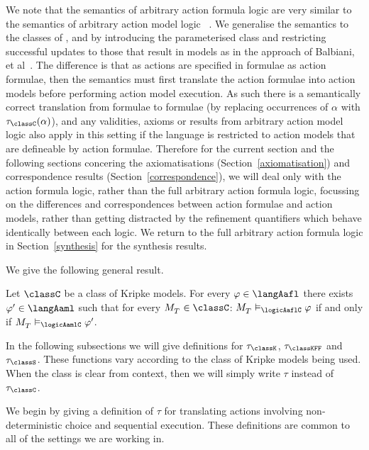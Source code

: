 We note that the semantics of arbitrary action formula logic \logicAaflC{} are very similar to the semantics of arbitrary action model logic \logicAamlC{}~\cite{hales:2013}.
We generalise the semantics to the classes of \classK{}, \classKFF{} and \classS{} by introducing the parameterised class \classC{} and restricting successful updates to those that result in \classC{} models as in the approach of Balbiani, et al~\cite{balbiani:2012}.
The difference is that as actions are specified in \langAafl{} formulae as action formulae, then the semantics must first translate the action formulae into action models before performing action model execution.
As such there is a semantically correct translation from \langAafl{} formulae to \langAaml{} formulae (by replacing occurrences of $\alpha$ with $\tau_\classC(\alpha)$), and any validities, axioms or results from arbitrary action model logic also apply in this setting if the language is restricted to action models that are defineable by action formulae.
Therefore for the current section and the following sections concering the axiomatisations (Section~\ref{axiomatisation}) and correspondence results (Section~\ref{correspondence}), we will deal only with the action formula logic, rather than the full arbitrary action formula logic, focussing on the differences and correspondences between action formulae and action models, rather than getting distracted by the refinement quantifiers which behave identically between each logic.
We return to the full arbitrary action formula logic in Section~\ref{synthesis} for the synthesis results.

We give the following general result.

\begin{proposition}
    Let $\classC$ be a class of Kripke models.
    For every $\phi \in \langAafl$ there exists $\phi' \in \langAaml$ such that for every $\kPModel{\kStatesT} \in \classC$: $\kPModel{\kStatesT} \entails_\logicAaflC \phi$ if and only if $\kPModel{\kStatesT} \entails_\logicAamlC \phi'$.
\end{proposition}

In the following subsections we will give definitions for $\tau_\classK$, $\tau_\classKFF$ and $\tau_\classS$.
These functions vary according to the class of Kripke models being used. When the class is clear from context, then we will simply write $\tau$ instead of $\tau_\classC$.

We begin by giving a definition of $\tau$ for translating actions involving non-deterministic choice and sequential execution.
These definitions are common to all of the settings we are working in.

